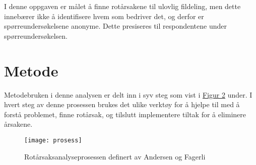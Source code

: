 I denne oppgaven er målet å finne rotårsakene til ulovlig fildeling, men dette innebærer ikke å identifisere hvem som bedriver det, og derfor er spørreundersøkelsene anonyme. Dette presiseres til respondentene under spørreundersøkelsen.

\section{Metode}
Metodebruken i denne analysen er delt inn i syv steg som vist i \hyperref[fig:prosess]{Figur 2} under. I hvert steg av denne prosessen brukes det ulike verktøy for å hjelpe til med å forstå problemet, finne rotårsak, og tilslutt implementere tiltak for å eliminere årsakene. 
\begin{figure}[H]
    \centering
    \texttt{[image: prosess]}
    \label{fig:prosess}
    \caption[Rotårsaksanalyseprosessen]{Rotårsaksanalyseprosessen definert av Andersen og Fagerli}
\end{figure}